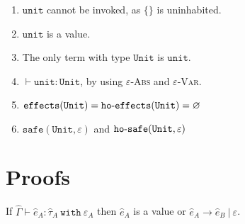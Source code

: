 \documentclass{llncs}
\newcommand{\keywadj}[1]{\mathtt{#1}}
\newcommand{\keyw}[1]{\keywadj{#1}~}
\newcommand{\kw}[1]{\keyw{ #1 }}
\newcommand{\kwa}[1]{\keywadj{ #1 }}
\newcommand{\hyphen}{\hbox{-}}
\newcommand{\unit}[0]{ \kwa{unit} }
\newcommand{\Unit}[0]{ \kwa{Unit} }
\begin{document}
\begin{enumerate}
	\item $\unit$ cannot be invoked, as $\{\}$ is uninhabited.
	\item $\unit$ is a value.
	\item The only term with type $\Unit$ is $\unit$.
	\item $\vdash \unit : \Unit$, by using \textsc{$\varepsilon$-Abs} and \textsc{$\varepsilon$-Var}.
	\item $\kwa{effects}(\Unit) = \kwa{ho \hyphen effects}(\Unit) = \varnothing$
	\item $\kwa{safe}(\Unit, \varepsilon)$ and $\kwa{ho \hyphen safe}(\Unit, \varepsilon)$
\end{enumerate}

\section{Proofs}

\begin{theorem}[Progress]
If $\hat \Gamma \vdash \hat e_A: \hat \tau_A~\kw{with} \varepsilon_A$ then $\hat e_A$ is a value or $\hat e_A \longrightarrow \hat e_B~|~\varepsilon$.
\end{theorem}
\end{document}

